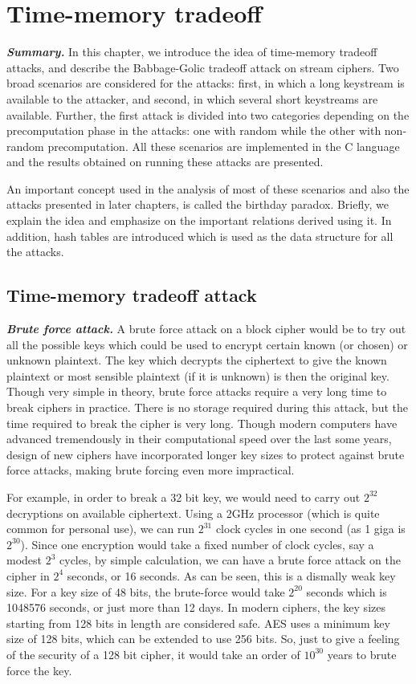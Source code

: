 \chapter{Time-memory tradeoff}

\indent \textbf{\textit{Summary.}} In this chapter, we introduce the idea of time-memory tradeoff attacks, and describe the Babbage-Golic tradeoff attack on stream ciphers. Two broad scenarios are considered for the attacks: first, in which a long keystream is available to the attacker, and second, in which several short keystreams are available. Further, the first attack is divided into two categories depending on the precomputation phase in the attacks: one with random while the other with non-random precomputation. All these scenarios are implemented in the C language and the results obtained on running these attacks are presented. 

An important concept used in the analysis of most of these scenarios and also the attacks presented in later chapters, is called the birthday paradox. Briefly, we explain the idea and emphasize on the important relations derived using it. In addition, hash tables are introduced which is used as the data structure for all the attacks. 

\section{Time-memory tradeoff attack}

\noindent \textit{\textbf{Brute force attack.}} A brute force attack on a block cipher would be to try out all the possible keys which could be used to encrypt certain known (or chosen) or unknown plaintext. The key which decrypts the ciphertext to give the known plaintext or most sensible plaintext (if it is unknown) is then the original key. Though very simple in theory, brute force attacks require a very long time to break ciphers in practice. There is no storage required during this attack, but the time required to break the cipher is very long. Though modern computers have advanced tremendously in their computational speed over the last some years, design of new ciphers have incorporated longer key sizes to protect against brute force attacks, making brute forcing even more impractical.

For example, in order to break a 32 bit key, we would need to carry out $2^{32}$ decryptions on available ciphertext. Using a 2GHz processor (which is quite common for personal use), we can run $2^{31}$ clock cycles in one second (as 1 giga is $2^{30}$). Since one encryption would take a fixed number of clock cycles, say a modest $2^3$ cycles, by simple calculation, we can have a brute force attack on the cipher in $2^4$ seconds, or 16 seconds. As can be seen, this is a dismally weak key size. For a key size of 48 bits, the brute-force would take $2^{20}$ seconds which is 1048576 seconds, or just more than 12 days. In modern ciphers, the key sizes starting from 128 bits in length are considered safe. AES uses a minimum key size of 128 bits, which can be extended to use 256 bits. So, just to give a feeling of the security of a 128 bit cipher, it would take an order of $10^{30}$ years to brute force the key.\\

